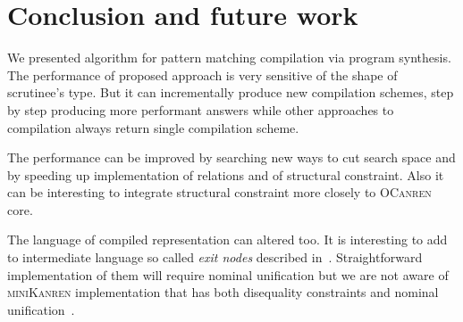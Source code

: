 \section{Conclusion and future work}

We presented algorithm for pattern matching compilation via program synthesis. The performance of proposed approach is very sensitive of the shape of scrutinee's type. 
But it can incrementally produce new compilation schemes,  step by step producing more performant answers while other approaches to compilation always return single compilation scheme.

The performance can be improved by searching new ways to cut search space and by speeding up implementation of relations and of structural constraint. Also it can be interesting to integrate structural constraint more closely to \textsc{OCanren} core.

The language of compiled representation can altered too. It is interesting to add to intermediate language so called \emph{exit nodes} described in~\cite{maranget2001}.
Straightforward implementation of them will require nominal unification but we are not aware of \textsc{miniKanren} implementation that has both disequality constraints and nominal unification~\cite{alphaKanren}.



